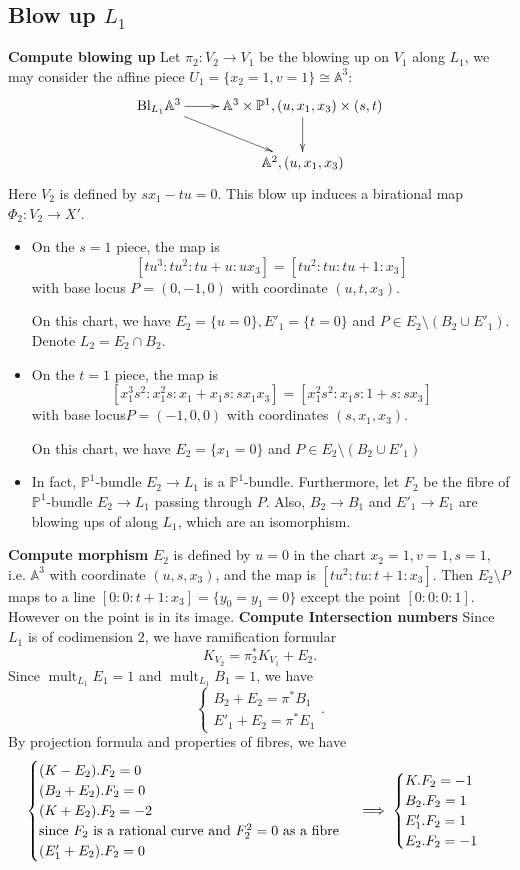 \documentclass{article}
\begin{document}
\subsection{Blow up $ L_1 $}
\textbf{Compute blowing up}
Let $ \pi_2:V_2\to V_1  $ be the blowing up on $ V_1 $ along $ L_1 $, we may consider the affine piece $ U_1=\{x_2=1,v=1\}\cong \mathbb{A}^3 $:
\[ \xymatrix{
	\mathrm{Bl}_{L_1}\mathbb{A}^3\ar[r]\ar[rd]&\mathbb{A}^3\times \mathbb{P}^1,(u,x_1,x_3)\times (s,t)\ar[d]\\
	&\mathbb{A}^2,(u,x_1,x_3)	} \]
Here $ V_2 $ is defined by $ sx_1-tu=0 $. This blow up induces a birational map $ \Phi_2:V_2\to X' $.
\begin{itemize}
	\item On the $ s=1 $ piece, the map is
	\[ [tu^3:tu^2:tu+u:ux_3]=[tu^2:tu:tu+1:x_3] \]
	with base locus $ P=(0,-1,0) $ with coordinate $ (u,t,x_3) $.
	
	On this chart, we have $ E_2=\{u=0\},E'_1=\{t=0\} $ and $ P\in E_2\setminus(B_2\cup E'_1) $.  Denote $ L_2=E_2\cap B_2 $.
	\item On the $ t=1 $ piece, the map is
	\[ [x_1^3s^2:x_1^2s:x_1+x_1s:sx_1x_3]=[x_1^2s^2:x_1s:1+s:sx_3]\]
	with base locus$ P=(-1,0,0) $ with coordinates $ (s,x_1,x_3) $.
	
	On this chart, we have $ E_2=\{x_1=0\} $ and $ P\in E_2\setminus(B_2\cup E'_1) $
	\item In fact, $ \mathbb{P}^1 $-bundle $ E_2\to L_1 $ is a $ \mathbb{P}^1 $-bundle. Furthermore, let  $ F_2 $ be the fibre of $ \mathbb{P}^1 $-bundle $ E_2\to L_1 $ passing through $ P $. Also, $ B_2\to B_1 $ and $ E'_1\to E_1 $ are blowing ups of along $ L_1$, which are an isomorphism.
\end{itemize}
\textbf{Compute morphism}
$ E_2 $ is defined by $ u=0 $ in the chart $ x_2=1,v=1,s=1 $, i.e. $ \mathbb{A}^3 $ with coordinate $ (u,s,x_3) $, and the map is $ [tu^2:tu:t+1:x_3] $. Then $ E_2\setminus P $ maps to a line $ [0:0:t+1:x_3]=\{y_0=y_1=0\} $ except the point $ [0:0:0:1] $. However on the point is in its image.
\textbf{Compute Intersection numbers}
Since $ L_1 $ is of codimension $ 2 $, we have ramification formular
\[ K_{V_2}=\pi_2^* K_{V_1}+E_2. \]
Since $ \operatorname{mult}_{L_1}E_1=1 $ and $ \operatorname{mult}_{L_1}B_1=1 $, we have
\[\begin{cases}
	B_2+E_2=\pi^*B_1\\
	E'_1+E_2=\pi^*E_1
\end{cases}  .\]
By projection formula and properties of fibres, we have
\[ \begin{cases}
	(K-E_2).F_2=0\\
	(B_2+E_2).F_2=0\\
	(K+E_2).F_2=-2 \\
	\text{since $ F_2 $ is a rational curve and $ F_2^2=0 $ as a fibre}\\
	(E_1'+E_2).F_2=0
\end{cases} \implies
\begin{cases}
	K.F_2=-1\\
	B_2.F_2=1\\
	E_1'.F_2=1\\
	E_2.F_2=-1\\
\end{cases}\]
\end{document}
